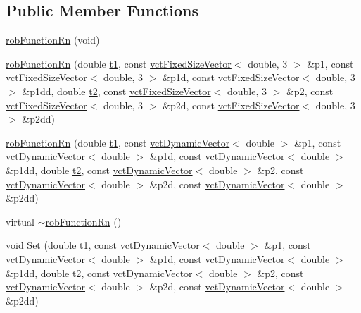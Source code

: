 \subsection*{Public Member Functions}
\begin{DoxyCompactItemize}
\item 
\hyperlink{classrob_function_rn_a44ee7bf0be512aafc162224b1c36e01f}{rob\+Function\+Rn} (void)
\item 
\hyperlink{classrob_function_rn_ac2d173943adbf50617077a352072b8a7}{rob\+Function\+Rn} (double \hyperlink{classrob_function_a9a4b408a3a5a8ae927caec3b6bac36ef}{t1}, const \hyperlink{classvct_fixed_size_vector}{vct\+Fixed\+Size\+Vector}$<$ double, 3 $>$ \&p1, const \hyperlink{classvct_fixed_size_vector}{vct\+Fixed\+Size\+Vector}$<$ double, 3 $>$ \&p1d, const \hyperlink{classvct_fixed_size_vector}{vct\+Fixed\+Size\+Vector}$<$ double, 3 $>$ \&p1dd, double \hyperlink{classrob_function_abf15c2d695ab4cc6336e19862327858f}{t2}, const \hyperlink{classvct_fixed_size_vector}{vct\+Fixed\+Size\+Vector}$<$ double, 3 $>$ \&p2, const \hyperlink{classvct_fixed_size_vector}{vct\+Fixed\+Size\+Vector}$<$ double, 3 $>$ \&p2d, const \hyperlink{classvct_fixed_size_vector}{vct\+Fixed\+Size\+Vector}$<$ double, 3 $>$ \&p2dd)
\item 
\hyperlink{classrob_function_rn_a99dc46624e4e38ac5eb6c27b71f6d821}{rob\+Function\+Rn} (double \hyperlink{classrob_function_a9a4b408a3a5a8ae927caec3b6bac36ef}{t1}, const \hyperlink{classvct_dynamic_vector}{vct\+Dynamic\+Vector}$<$ double $>$ \&p1, const \hyperlink{classvct_dynamic_vector}{vct\+Dynamic\+Vector}$<$ double $>$ \&p1d, const \hyperlink{classvct_dynamic_vector}{vct\+Dynamic\+Vector}$<$ double $>$ \&p1dd, double \hyperlink{classrob_function_abf15c2d695ab4cc6336e19862327858f}{t2}, const \hyperlink{classvct_dynamic_vector}{vct\+Dynamic\+Vector}$<$ double $>$ \&p2, const \hyperlink{classvct_dynamic_vector}{vct\+Dynamic\+Vector}$<$ double $>$ \&p2d, const \hyperlink{classvct_dynamic_vector}{vct\+Dynamic\+Vector}$<$ double $>$ \&p2dd)
\item 
virtual \hyperlink{classrob_function_rn_af8b8ae888a0c3a26afcb3bf2a3d5085f}{$\sim$rob\+Function\+Rn} ()
\item 
void \hyperlink{classrob_function_rn_ad7d1b47734c628597add8ec764f91f47}{Set} (double \hyperlink{classrob_function_a9a4b408a3a5a8ae927caec3b6bac36ef}{t1}, const \hyperlink{classvct_dynamic_vector}{vct\+Dynamic\+Vector}$<$ double $>$ \&p1, const \hyperlink{classvct_dynamic_vector}{vct\+Dynamic\+Vector}$<$ double $>$ \&p1d, const \hyperlink{classvct_dynamic_vector}{vct\+Dynamic\+Vector}$<$ double $>$ \&p1dd, double \hyperlink{classrob_function_abf15c2d695ab4cc6336e19862327858f}{t2}, const \hyperlink{classvct_dynamic_vector}{vct\+Dynamic\+Vector}$<$ double $>$ \&p2, const \hyperlink{classvct_dynamic_vector}{vct\+Dynamic\+Vector}$<$ double $>$ \&p2d, const \hyperlink{classvct_dynamic_vector}{vct\+Dynamic\+Vector}$<$ double $>$ \&p2dd)

\end{DoxyCompactItemize}
